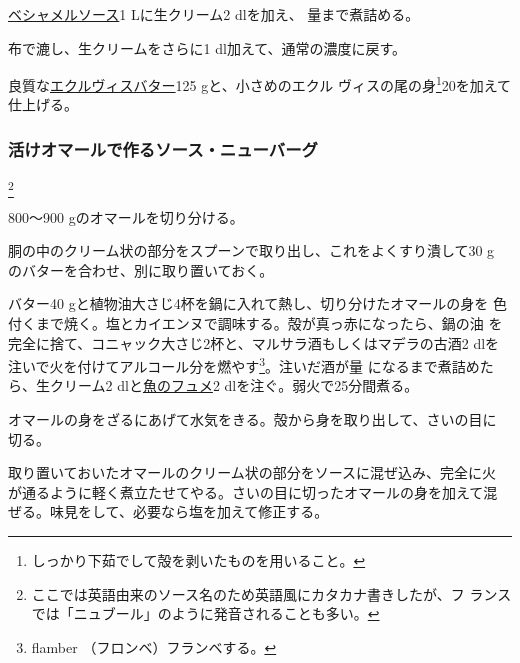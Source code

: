 \begin{recette}
\protect\hyperlink{sauce-bechamel}{ベシャメルソース}1 Lに生クリーム2
dlを加え、 \deuxtiers{}量まで煮詰める。

布で漉し、生クリームをさらに1\undemi{} dl加えて、通常の濃度に戻す。

良質な\protect\hyperlink{beurre-d-ecrevisse}{エクルヴィスバター}125
gと、小さめのエクル ヴィスの尾の身\footnote{しっかり下茹でして殻を剥いたものを用いること。}20を加えて仕上げる。

\maeaki

\hypertarget{sauce-new-burg-avec-le-homard-cru}{%
\subsubsection{活けオマールで作るソース・ニューバーグ}\label{sauce-new-burg-avec-le-homard-cru}}

\footnote{ここでは英語由来のソース名のため英語風にカタカナ書きしたが、フ
  ランスでは「ニュブール」のように発音されることも多い。}


800〜900 gのオマールを切り分ける。

胴の中のクリーム状の部分をスプーンで取り出し、これをよくすり潰して30 g
のバターを合わせ、別に取り置いておく。

バター40 gと植物油大さじ4杯を鍋に入れて熱し、切り分けたオマールの身を
色付くまで焼く。塩とカイエンヌで調味する。殻が真っ赤になったら、鍋の油
を完全に捨て、コニャック大さじ2杯と、マルサラ酒もしくはマデラの古酒2
dlを注いで火を付けてアルコール分を燃やす\footnote{flamber
  （フロンベ）フランベする。}。注いだ酒が\untiers{}量
になるまで煮詰めたら、生クリーム2
dlと\protect\hyperlink{fumet-de-poisson}{魚のフュメ}2
dlを注ぐ。弱火で25分間煮る。

オマールの身をざるにあげて水気をきる。殻から身を取り出して、さいの目に
切る。

取り置いておいたオマールのクリーム状の部分をソースに混ぜ込み、完全に火
が通るように軽く煮立たせてやる。さいの目に切ったオマールの身を加えて混
ぜる。味見をして、必要なら塩を加えて修正する。


\end{recette}
